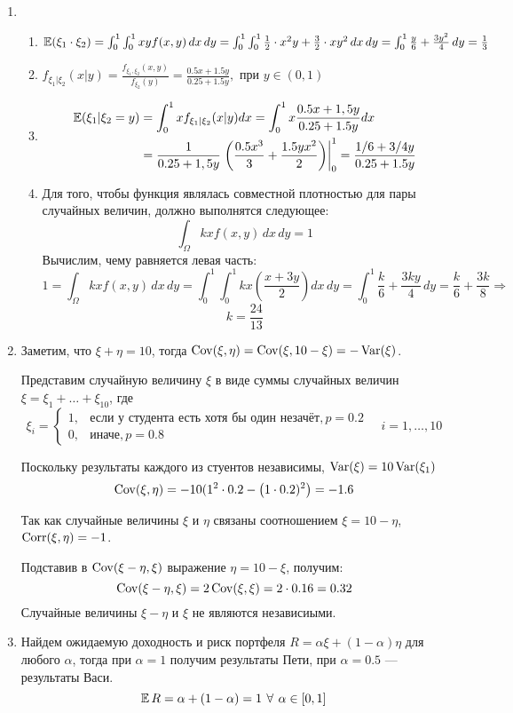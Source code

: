 \begin{enumerate}
\item
\begin{enumerate}
\item $ \operatorname{\mathbb{E}}({\xi_1 \cdot \xi_2}) = \int_{0}^1 \int_0^1 xy f(x,y) \, dx \, dy = \int_0^1 \int_0^1 \frac{1}{2}\cdot x^2y + \frac{3}{2}\cdot xy^2 \, dx \, dy = \int_{0}^1 \frac{y}{6} + \frac{3y^2}{4} \,dy = \frac{1}{3}$
\item $f_{\xi_1 | \xi_2} (x | y) = \frac{f_{\xi_1, \xi_2}(x, y)}{f_{\xi_2}(y)} = \frac{0.5x + 1.5y}{0.25 + 1.5y}, \text{ при } y \in (0,1)$
\item
\begin{align*}
\operatorname{\mathbb{E}}(\xi_1 | \xi_2 = y) &= \int_0^1 x f_{\xi_1 | \xi_2} (x | y) dx = \int_{0}^{1}  x \frac{0.5x + 1,5y}{0.25 + 1.5y} dx \\
&= \frac{1}{0.25 + 1,5y}  \left. \left( \dfrac{0.5x^3}{3} +  \dfrac{1.5yx^2}{2} \right) \right|_0^1  =  \frac{1/6 + 3/4y}{0.25 + 1.5y}
\end{align*}
\item
Для того, чтобы функция являлась совместной плотностью для пары случайных величин, должно выполнятся следующее:
\[
\int_{\Omega} kx f(x,y) \, dx \, dy = 1
\]
Вычислим, чему равняется левая часть:
\[
1 = \int_{\Omega} kx f(x,y) \, dx \, dy = \int_{0}^1 \int_{0}^1 kx \left(\frac{x + 3y}{2}\right) dx \, dy = \int_{0}^1 \frac{k}{6} + \frac{3ky}{4} \, dy = \frac{k}{6} + \frac{3k}{8} \Rightarrow
\]
\[
k = \frac{24}{13}
\]
\end{enumerate}
\item Заметим, что $\xi + \eta = 10$, тогда $\operatorname{Cov}(\xi, \eta) = \operatorname{Cov}(\xi, 10-\xi) = -\operatorname{Var}(\xi)$.

Представим случайную величину $\xi$ в виде суммы случайных величин $\xi = \xi_1 + \ldots + \xi_{10}$, где
\[
\xi_i = \begin{cases}
1, & \text{если у студента есть хотя бы один незачёт}, p=0.2 \\
0, & \text{иначе}, p=0.8
\end{cases} \quad i = 1, \ldots, 10
\]

Поскольку результаты каждого из стуентов независимы, $\operatorname{Var}(\xi) = 10\operatorname{Var}(\xi_1)$
\[
\operatorname{Cov}(\xi, \eta) = -10(1^2 \cdot 0.2 - \left(1\cdot 0.2)^2\right) = -1.6
\]

Так как случайные величины $\xi$ и $\eta$ связаны соотношением $\xi = 10 - \eta$, $\operatorname{Corr}(\xi, \eta)=-1$.

Подставив в $\operatorname{Cov}(\xi - \eta, \xi)$ выражение $\eta = 10 - \xi$, получим:
\[
\operatorname{Cov}(\xi - \eta, \xi) = 2 \operatorname{Cov}(\xi, \xi) = 2 \cdot 0.16 = 0.32
\]
Случайные величины $\xi - \eta$ и $\xi$ не являются независиыми.
\item Найдем ожидаемую доходность и риск портфеля $R = \alpha \xi + (1-\alpha) \eta$
для любого $\alpha$, тогда при $\alpha = 1$ получим результаты Пети,
при $\alpha = 0.5$ — результаты Васи.
\[
\operatorname{\mathbb{E}} R = \alpha + (1 - \alpha) = 1 \: \, \forall \, \: \alpha \in [0,1]
\]


\end{enumerate}
